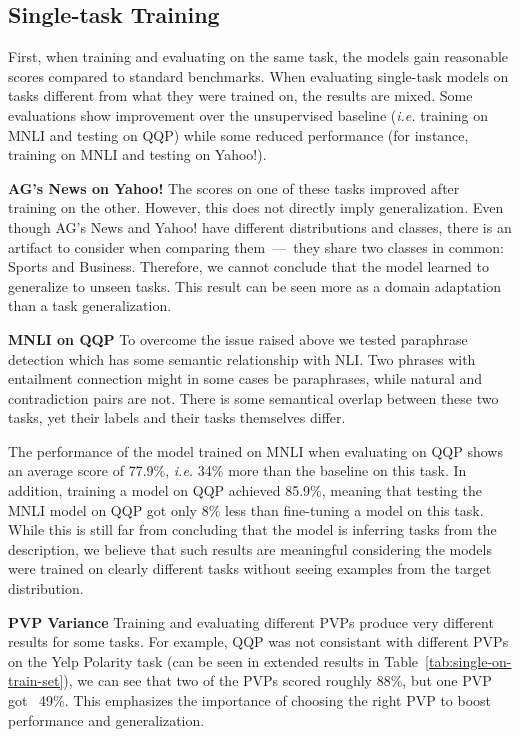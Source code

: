 \documentclass[11pt,a4paper]{article}
\newcommand{\subtitle}[1]{\vspace{5pt}\noindent\textbf{#1}\quad}
\begin{document}
\subsection{Single-task Training}
First, when training and evaluating on the same task, the models gain reasonable scores compared to standard benchmarks.
When evaluating single-task models on tasks different from what they were trained on, the results are mixed.
Some evaluations show improvement over the unsupervised baseline (\textit{i.e.} training on MNLI and testing on QQP)
while some reduced performance (for instance, training on MNLI and testing on Yahoo!).

\subtitle{AG's News on Yahoo!}
The scores on one of these tasks improved after training on the other.
However, this does not directly imply generalization.
Even though AG's News and Yahoo! have different distributions and classes, there is an artifact to consider when comparing them~---~they share two classes in common: Sports and Business.
Therefore, we cannot conclude that the model learned to generalize to unseen tasks.
This result can be seen more as a domain adaptation than a task generalization.

\subtitle{MNLI on QQP}
To overcome the issue raised above we tested paraphrase detection which has some semantic relationship with NLI.
Two phrases with entailment connection might in some cases be paraphrases, while natural and contradiction pairs are not.
There is some semantical overlap between these two tasks, yet their labels and their tasks themselves differ.

The performance of the model trained on MNLI when evaluating on QQP shows an average score of 77.9\%,
\textit{i.e.} 34\% more than the baseline on this task.
In addition, training a model on QQP achieved 85.9\%,
meaning that testing the MNLI model on QQP got only 8\% less than fine-tuning a model on this task.
While this is still far from concluding that the model is inferring tasks from the description, we believe that such results are meaningful considering the models were trained on clearly different tasks without seeing examples from the target distribution.

\subtitle{PVP Variance}
Training and evaluating different PVPs produce very different results for some tasks.
For example, QQP was not consistant with different PVPs on the Yelp Polarity task (can be seen in extended results in Table~\ref{tab:single-on-train-set}), we can see that two of the PVPs scored roughly 88\%, but one PVP got ~49\%.
This emphasizes the importance of choosing the right PVP to boost performance and generalization.
\end{document}

